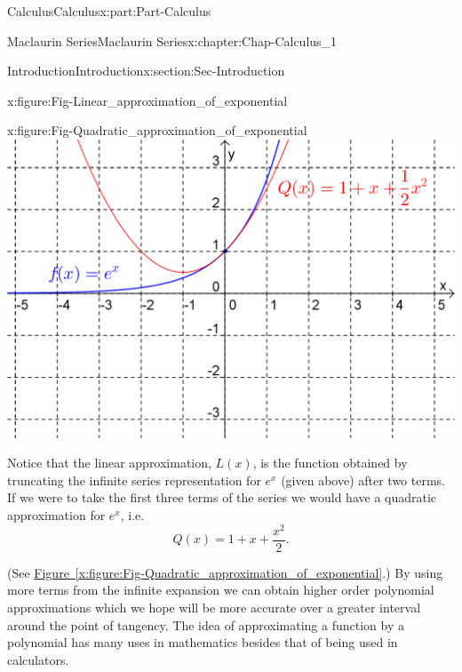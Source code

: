 \documentclass[oneside,10pt,]{book}
\newcommand{\xreffont}{\relax}
\numberwithin{equation}{section}
\begin{document}
\begin{partptx}{Calculus}{}{Calculus}{}{}{x:part:Part-Calculus}
\begin{chapterptx}{Maclaurin Series}{}{Maclaurin Series}{}{}{x:chapter:Chap-Calculus_1}
\begin{sectionptx}{Introduction}{}{Introduction}{}{}{x:section:Sec-Introduction}
\begin{sidebyside}{2}{0.025}{0.025}{0.05}
\begin{sbspanel}{0.45}
\begin{figureptx}{}{x:figure:Fig-Linear_approximation_of_exponential}{}
\tcblower
\end{figureptx}%
\end{sbspanel}%
\begin{sbspanel}{0.45}%
\begin{figureptx}{}{x:figure:Fig-Quadratic_approximation_of_exponential}{}%
\includegraphics[width=\linewidth]{./Calculus/Images/1/Quadratic_approximation_of_exponential.png}
\tcblower
\end{figureptx}%
\end{sbspanel}%
\end{sidebyside}%
\par
Notice that the linear approximation, \(L(x)\), is the function obtained by truncating the infinite series representation for \(e^x\) (given above) after two terms. If we were to take the first three terms of the series we would have a quadratic approximation for \(e^x\), i.e.%
\begin{equation*}
Q(x) = 1 + x + \frac{x^2}{2}.
\end{equation*}
%
\par
(See \hyperref[x:figure:Fig-Quadratic_approximation_of_exponential]{Figure~{\xreffont\ref{x:figure:Fig-Quadratic_approximation_of_exponential}}}.) By using more terms from the infinite expansion we can obtain higher order polynomial approximations which we hope will be more accurate over a greater interval around the point of tangency. The idea of approximating a function by a polynomial has many uses in mathematics besides that of being used in calculators.%
\end{sectionptx}
%
%
\typeout{************************************************}
\typeout{************************************************}

\end{chapterptx}
\end{partptx}
\end{document}
